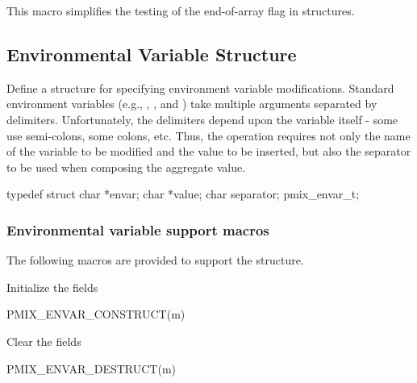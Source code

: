 This macro simplifies the testing of the end-of-array flag in  structures.

\subsection{Environmental Variable Structure}

Define a structure for specifying environment variable modifications.
Standard environment variables (e.g., , , and )
take multiple arguments separated by delimiters. Unfortunately, the delimiters
depend upon the variable itself - some use semi-colons, some colons, etc. Thus,
the operation requires not only the name of the variable to be modified and
the value to be inserted, but also the separator to be used when composing
the aggregate value.

\cspecificstart
\begin{codepar}
typedef struct {
    char *envar;
    char *value;
    char separator;
} pmix_envar_t;
\end{codepar}
\cspecificend


\subsubsection{Environmental variable support macros}

The following macros are provided to support the  structure.


Initialize the  fields

\cspecificstart
\begin{codepar}
PMIX_ENVAR_CONSTRUCT(m)
\end{codepar}
\cspecificend

\begin{arglist}
\end{arglist}


Clear the  fields

\cspecificstart
\begin{codepar}
PMIX_ENVAR_DESTRUCT(m)
\end{codepar}
\cspecificend

